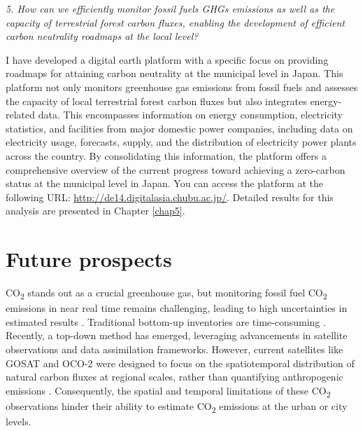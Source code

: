 \textit{5. How can we efficiently monitor fossil fuels GHGs emissions as well as the capacity of terrestrial forest carbon fluxes, enabling the development of efficient carbon neutrality roadmaps at the local level?} \par
I have developed a digital earth platform with a specific focus on providing roadmaps for attaining carbon neutrality at the municipal level in Japan. This platform not only monitors greenhouse gas emissions from fossil fuels and assesses the capacity of local terrestrial forest carbon fluxes but also integrates energy-related data. This encompasses information on energy consumption, electricity statistics, and facilities from major domestic power companies, including data on electricity usage, forecasts, supply, and the distribution of electricity power plants across the country. By consolidating this information, the platform offers a comprehensive overview of the current progress toward achieving a zero-carbon status at the municipal level in Japan. You can access the platform at the following URL: \url{http://de14.digitalasia.chubu.ac.jp/}. Detailed results for this analysis are presented in Chapter \ref{chap5}. \par

\section{Future prospects}
CO\textsubscript{2} stands out as a crucial greenhouse gas, but monitoring fossil fuel CO\textsubscript{2} emissions in near real time remains challenging, leading to high uncertainties in estimated results \citep{marland2008uncertainties}. Traditional bottom-up inventories are time-consuming \citep{marland2008uncertainties}. Recently, a top-down method has emerged, leveraging advancements in satellite observations and data assimilation frameworks. However, current satellites like GOSAT and OCO-2 were designed to focus on the spatiotemporal distribution of natural carbon fluxes at regional scales, rather than quantifying anthropogenic emissions \citep{nassar2017quantifying, yang2023using}. Consequently, the spatial and temporal limitations of these CO\textsubscript{2} observations hinder their ability to estimate CO\textsubscript{2} emissions at the urban or city levels. \par

